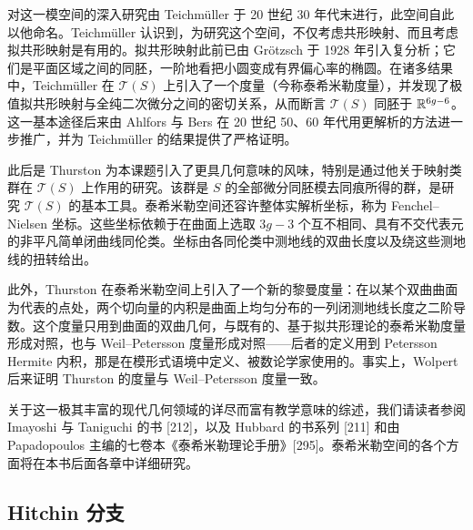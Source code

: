 对这一模空间的深入研究由 Teichm\"uller 于 20 世纪 30 年代末进行，此空间自此以他命名。Teichm\"uller 认识到，为研究这个空间，不仅考虑共形映射、而且考虑拟共形映射是有用的。拟共形映射此前已由 Gr\"otzsch 于 1928 年引入复分析；它们是平面区域之间的同胚，一阶地看把小圆变成有界偏心率的椭圆。在诸多结果中，Teichm\"uller 在 $\mathcal{T}(S)$ 上引入了一个度量（今称泰希米勒度量），并发现了极值拟共形映射与全纯二次微分之间的密切关系，从而断言 $\mathcal{T}(S)$ 同胚于 $\mathbb{R}^{6g-6}$。这一基本途径后来由 Ahlfors 与 Bers 在 20 世纪 50、60 年代用更解析的方法进一步推广，并为 Teichm\"uller 的结果提供了严格证明。

此后是 Thurston 为本课题引入了更具几何意味的风味，特别是通过他关于映射类群在 $\mathcal{T}(S)$ 上作用的研究。该群是 $S$ 的全部微分同胚模去同痕所得的群，是研究 $\mathcal{T}(S)$ 的基本工具。泰希米勒空间还容许整体实解析坐标，称为 Fenchel--Nielsen 坐标。这些坐标依赖于在曲面上选取 $3g-3$ 个互不相同、具有不交代表元的非平凡简单闭曲线同伦类。坐标由各同伦类中测地线的双曲长度以及绕这些测地线的扭转给出。

此外，Thurston 在泰希米勒空间上引入了一个新的黎曼度量：在以某个双曲曲面为代表的点处，两个切向量的内积是曲面上均匀分布的一列闭测地线长度之二阶导数。这个度量只用到曲面的双曲几何，与既有的、基于拟共形理论的泰希米勒度量形成对照，也与 Weil--Petersson 度量形成对照——后者的定义用到 Petersson Hermite 内积，那是在模形式语境中定义、被数论学家使用的。事实上，Wolpert 后来证明 Thurston 的度量与 Weil--Petersson 度量一致。


关于这一极其丰富的现代几何领域的详尽而富有教学意味的综述，我们请读者参阅 Imayoshi 与 Taniguchi 的书 [212]，以及 Hubbard 的书系列 [211] 和由 Papadopoulos 主编的七卷本《泰希米勒理论手册》[295]。泰希米勒空间的各个方面将在本书后面各章中详细研究。

\subsection*{Hitchin 分支}

